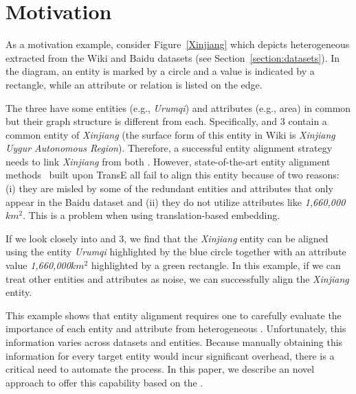 \section{Motivation}
As a motivation example, consider Figure~\ref{Xinjiang} which depicts  heterogeneous \KGs extracted from the Wiki and Baidu
datasets (see Section~\ref{section:datasets}). In the diagram, an entity is marked by a circle and a value is indicated by a rectangle,
while an attribute or relation is listed on the edge. 

The three \KGs have some entities (e.g., \emph{Urumqi}) and attributes (e.g., area) in common but their graph structure is different from
each. Specifically,  and 3 contain a common entity of \emph{Xinjiang} (the surface form of this entity in Wiki is \emph{Xinjiang
Uygur Autonomous Region}). Therefore, a successful entity alignment strategy needs to link \emph{Xinjiang} from both \KGs. However,
state-of-the-art entity alignment methods~\cite{hao2016joint,chen2016multilingual,sun2017cross,zhu2017iterative} built upon TransE all fail
to align this entity because of two reasons: (i) they are misled by some of the redundant entities and attributes that only appear in the
Baidu dataset and (ii) they do not utilize attributes like \emph{1,660,000$km^2$}. This is a problem when using translation-based
embedding.

If we look closely into  and 3, we find that the \emph{Xinjiang} entity can be aligned using the entity \emph{Urumqi} highlighted by
the blue circle together with an attribute value \emph{1,660,000$km^2$} highlighted by a green rectangle. In this example, if we can treat
other entities and attributes as noise, we can successfully align the \emph{Xinjiang} entity.

This example shows that entity alignment requires one to carefully evaluate the importance of each entity and attribute from heterogeneous
\KGs. Unfortunately, this information varies across datasets and entities. Because manually obtaining this information for every target
entity would incur significant overhead, there is a critical need to automate the process. In this paper, we describe an novel approach to
offer this capability based on the \RGCN.
